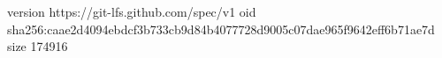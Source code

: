 version https://git-lfs.github.com/spec/v1
oid sha256:caae2d4094ebdcf3b733cb9d84b4077728d9005c07dae965f9642eff6b71ae7d
size 174916
